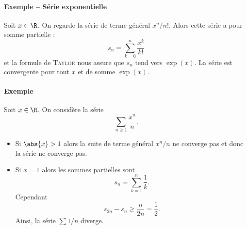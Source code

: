 \documentclass{mybourbaki}
\begin{document}
\paragraph{Exemple -- Série exponentielle}Soit $x\in \R$. On regarde la série de terme général $x^{n}/n!$. Alors cette série a pour somme partielle : \[s_n = \sum_{k=0}^{n}\frac{x^{k}}{k!}\]et la formule de \textsc{Taylor} nous assure que $s_n$ tend vers $\exp(x)$. La série est convergente pour tout $x$ et de somme $\exp(x)$.

\paragraph{Exemple}Soit $x\in \R$. On considère la série \[ \sum_{n\geq 1}\frac{x^{n}}{n}.\]
\begin{itemize}
\item Si $\abs{x}>1$ alors la suite de terme général $x^{n}/n$ ne converge pas et donc la série ne converge pas.
\item Si $x=1$ alors les sommes partielles sont \[ s_n = \sum_{k=1}^{n}\frac{1}{k}.\]Cependant \[ s_{2n} - s_n \geq \frac{n}{2n} = \frac{1}{2}.\]Ainsi, la série $\sum 1/n$ diverge.
\end{itemize}
\end{document}
